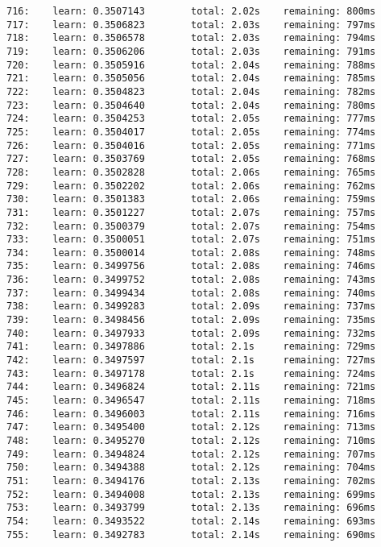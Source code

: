 \documentclass[11pt]{article}
\begin{document}
\begin{Verbatim}[commandchars=\\\{\}]
716:    learn: 0.3507143        total: 2.02s    remaining: 800ms
717:    learn: 0.3506823        total: 2.03s    remaining: 797ms
718:    learn: 0.3506578        total: 2.03s    remaining: 794ms
719:    learn: 0.3506206        total: 2.03s    remaining: 791ms
720:    learn: 0.3505916        total: 2.04s    remaining: 788ms
721:    learn: 0.3505056        total: 2.04s    remaining: 785ms
722:    learn: 0.3504823        total: 2.04s    remaining: 782ms
723:    learn: 0.3504640        total: 2.04s    remaining: 780ms
724:    learn: 0.3504253        total: 2.05s    remaining: 777ms
725:    learn: 0.3504017        total: 2.05s    remaining: 774ms
726:    learn: 0.3504016        total: 2.05s    remaining: 771ms
727:    learn: 0.3503769        total: 2.05s    remaining: 768ms
728:    learn: 0.3502828        total: 2.06s    remaining: 765ms
729:    learn: 0.3502202        total: 2.06s    remaining: 762ms
730:    learn: 0.3501383        total: 2.06s    remaining: 759ms
731:    learn: 0.3501227        total: 2.07s    remaining: 757ms
732:    learn: 0.3500379        total: 2.07s    remaining: 754ms
733:    learn: 0.3500051        total: 2.07s    remaining: 751ms
734:    learn: 0.3500014        total: 2.08s    remaining: 748ms
735:    learn: 0.3499756        total: 2.08s    remaining: 746ms
736:    learn: 0.3499752        total: 2.08s    remaining: 743ms
737:    learn: 0.3499434        total: 2.08s    remaining: 740ms
738:    learn: 0.3499283        total: 2.09s    remaining: 737ms
739:    learn: 0.3498456        total: 2.09s    remaining: 735ms
740:    learn: 0.3497933        total: 2.09s    remaining: 732ms
741:    learn: 0.3497886        total: 2.1s     remaining: 729ms
742:    learn: 0.3497597        total: 2.1s     remaining: 727ms
743:    learn: 0.3497178        total: 2.1s     remaining: 724ms
744:    learn: 0.3496824        total: 2.11s    remaining: 721ms
745:    learn: 0.3496547        total: 2.11s    remaining: 718ms
746:    learn: 0.3496003        total: 2.11s    remaining: 716ms
747:    learn: 0.3495400        total: 2.12s    remaining: 713ms
748:    learn: 0.3495270        total: 2.12s    remaining: 710ms
749:    learn: 0.3494824        total: 2.12s    remaining: 707ms
750:    learn: 0.3494388        total: 2.12s    remaining: 704ms
751:    learn: 0.3494176        total: 2.13s    remaining: 702ms
752:    learn: 0.3494008        total: 2.13s    remaining: 699ms
753:    learn: 0.3493799        total: 2.13s    remaining: 696ms
754:    learn: 0.3493522        total: 2.14s    remaining: 693ms
755:    learn: 0.3492783        total: 2.14s    remaining: 690ms

\end{Verbatim}
\end{document}
